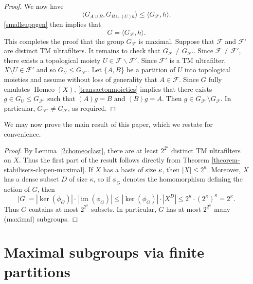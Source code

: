 \documentclass[11pt]{amsart}
\newtheorem{corollary}[theorem]{Corollary}
\theoremstyle{definition}
\newcommand{\filter}{\mathcal{F}}
\newcommand{\Homeo}{\operatorname{Homeo}}
\newcommand{\N}{\mathbb N}
\newcommand{\Q}{\mathbb Q}
\newcommand{\F}{\mathcal F}
\newcommand{\im}{\operatorname{im}}
\begin{document}
\begin{proof}
We now have
\[\langle G_{A\cup B},G_{B\cup (U)h} \rangle \leq 
 \langle G_\filter ,h\rangle.\]
 \cref{smallsuppgen} then implies that 
 \[G= \langle G_{\F},h \rangle.\]
 This completes the proof that the group \(G_{\F}\) is maximal. Suppose that $\F$ and $\F'$ are distinct TM ultrafilters.
It remains to check that $G_\F\neq G_{\F'}$. Since $\mathcal{F}\neq \mathcal{F}'$, there exists a topological moiety \(U \in \mathcal{F}\backslash \mathcal{F}'\).
Since $\mathcal{F}'$ is a TM ultrafilter, $X \setminus U \in  \mathcal{F}'$ and so $G_{U}\leq G_{\mathcal{F}'}$. Let $\{A, B\}$ be a partition of $U$ into topological moieties and assume without loss of generality that $A \in \mathcal{F}$. Since $G$ fully emulates $\Homeo(X)$, \cref{transactonmoieties} implies that there exists $g \in G_{U}\leq G_{\mathcal{F}'}$ such that $(A)g=B$ and $(B)g=A$. Then $g \in G_{\mathcal{F}'}\setminus G_{\mathcal{F}}$. In particular, $G_{\mathcal{F}'}\neq G_{\mathcal{F}}$, as required. 
\end{proof}

We may now prove the main result of this paper, which we restate for convenience. 

\bigmaxtheorem*
\begin{proof}
    By Lemma~\ref{2chomeoclast}, there are at least $2^{ 2^{\kappa}}$ distinct TM ultrafilters on $X$. Thus the first part of the result follows directly from Theorem \ref{theorem-stabilisers-clopen-maximal}. If $X$ has a basis of size $\kappa$, then \(|X|\leq 2^{\kappa}\). Moreover, \(X\) has a dense subset \(D\) of size \(\kappa\), so if $\phi_G$ denotes the homomorphism defining the action of $G$, then \[|G|=|\ker(\phi_G)|\cdot|\im(\phi_G)|\leq |\ker(\phi_G)|\cdot |X^D|\leq  2^{\kappa}\cdot (2^\kappa)^{\kappa}=2^{\kappa}.\] Thus \(G\) contains at most \(2^{2^{\kappa}}\) subsets. In particular, $G$ has at most $2^{2^{\kappa}}$ many (maximal) subgroups.
\end{proof}





\section{Maximal subgroups via finite partitions}\label{section:partitions}
\end{document}
